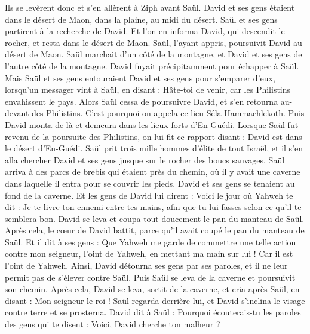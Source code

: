 \begin{multicols}{2}
Ils se levèrent donc et s'en allèrent à Ziph avant Saül. David et ses gens étaient dans le désert de Maon, dans la plaine, au midi du désert.
Saül et ses gens partirent à la recherche de David. Et l’on en informa David, qui descendit le rocher, et resta dans le désert de Maon. Saül, l’ayant appris, poursuivit David au désert de Maon.
Saül marchait d’un côté de la montagne, et David et ses gens de l'autre côté de la montagne. David fuyait précipitamment pour échapper à Saül. Mais Saül et ses gens entouraient David et ses gens pour s’emparer d’eux,
lorsqu’un messager vint à Saül, en disant : Hâte-toi de venir, car les Philistins envahissent le pays.
Alors Saül cessa de poursuivre David, et s'en retourna au-devant des Philistins. C'est pourquoi on appela ce lieu Séla-Hammachlekoth.
\VerseOne{}Puis David monta de là et demeura dans les lieux forts d'En-Guédi.
Lorsque Saül fut revenu de la poursuite des Philistins, on lui fit ce rapport disant : David est dans le désert d’En-Guédi.
Saül prit trois mille hommes d'élite de tout Israël, et il s'en alla chercher David et ses gens jusque sur le rocher des boucs sauvages.
Saül arriva à des parcs de brebis qui étaient près du chemin, où il y avait une caverne dans laquelle il entra pour se couvrir les pieds. David et ses gens se tenaient au fond de la caverne.
Et les gens de David lui dirent : Voici le jour où Yahweh te dit : Je te livre ton ennemi entre tes mains, afin que tu lui fasses selon ce qu'il te semblera bon. David se leva et coupa tout doucement le pan du manteau de Saül.
Après cela, le cœur de David battit, parce qu'il avait coupé le pan du manteau de Saül.
Et il dit à ses gens : Que Yahweh me garde de commettre une telle action contre mon seigneur, l'oint de Yahweh, en mettant ma main sur lui ! Car il est l'oint de Yahweh.
Ainsi, David détourna ses gens par ses paroles, et il ne leur permit pas de s'élever contre Saül. Puis Saül se leva de la caverne et poursuivit son chemin.
Après cela, David se leva, sortit de la caverne, et cria après Saül, en disant : Mon seigneur le roi ! Saül regarda derrière lui, et David s'inclina le visage contre terre et se prosterna.
David dit à Saül : Pourquoi écouterais-tu les paroles des gens qui te disent : Voici, David cherche ton malheur ?

\end{multicols}
